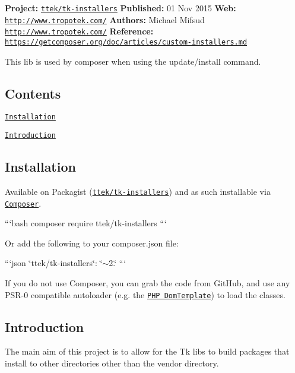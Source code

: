{\bfseries Project\+:} \href{http://packagist.org/packages/ttek/tk-installers}{\tt ttek/tk-\/installers} {\bfseries Published\+:} 01 Nov 2015 {\bfseries Web\+:} \href{http://www.tropotek.com/}{\tt http\+://www.\+tropotek.\+com/} {\bfseries Authors\+:} Michael Mifsud \href{http://www.tropotek.com/}{\tt http\+://www.\+tropotek.\+com/} {\bfseries Reference\+:} \href{https://getcomposer.org/doc/articles/custom-installers.md}{\tt https\+://getcomposer.\+org/doc/articles/custom-\/installers.\+md}

This lib is used by composer when using the update/install command.

\subsection*{Contents}


\begin{DoxyItemize}
\item \href{#installation}{\tt Installation}
\item \href{#introduction}{\tt Introduction}
\end{DoxyItemize}

\subsection*{Installation}

Available on Packagist (\href{http://packagist.org/packages/ttek/tk-installers}{\tt ttek/tk-\/installers}) and as such installable via \href{http://getcomposer.org/}{\tt Composer}.

```bash composer require ttek/tk-\/installers ```

Or add the following to your composer.\+json file\+:

```json \char`\"{}ttek/tk-\/installers\char`\"{}\+: \char`\"{}$\sim$2.\char`\"{} ```

If you do not use Composer, you can grab the code from Git\+Hub, and use any P\+S\+R-\/0 compatible autoloader (e.\+g. the \href{https://github.com/tropotek/tk-installers}{\tt P\+H\+P Dom\+Template}) to load the classes.

\subsection*{Introduction}

The main aim of this project is to allow for the Tk libs to build packages that install to other directories other than the {\ttfamily vendor} directory.

